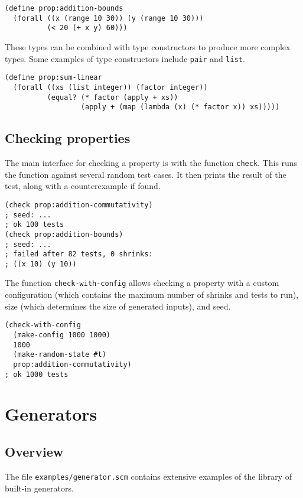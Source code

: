 \documentclass{scrartcl}
\begin{document}
\begin{verbatim}
(define prop:addition-bounds
  (forall ((x (range 10 30)) (y (range 10 30)))
          (< 20 (+ x y) 60)))
\end{verbatim}

These types can be combined with type constructors to produce more complex
types. Some examples of type constructors include \verb|pair| and \verb|list|.

\begin{verbatim}
(define prop:sum-linear
  (forall ((xs (list integer)) (factor integer))
          (equal? (* factor (apply + xs))
                  (apply + (map (lambda (x) (* factor x)) xs)))))
\end{verbatim}

\subsection{Checking properties}
The main interface for checking a property is with the function \verb|check|.
This runs the function against several random test cases. It then prints
the result of the test, along with a counterexample if found.

\begin{verbatim}
(check prop:addition-commutativity)
; seed: ...
; ok 100 tests
(check prop:addition-bounds)
; seed: ...
; failed after 82 tests, 0 shrinks:
; ((x 10) (y 10))
\end{verbatim}

The function \verb|check-with-config| allows checking a property with a custom
configuration (which contains the maximum number of shrinks and tests to run),
size (which determines the size of generated inputs), and seed.

\begin{verbatim}
(check-with-config
  (make-config 1000 1000)
  1000
  (make-random-state #t)
  prop:addition-commutativity)
; ok 1000 tests
\end{verbatim}

\section{Generators}\label{sec:generators}
\subsection{Overview}

The file \verb|examples/generator.scm| contains extensive examples of the
library of built-in generators.
\end{document}
